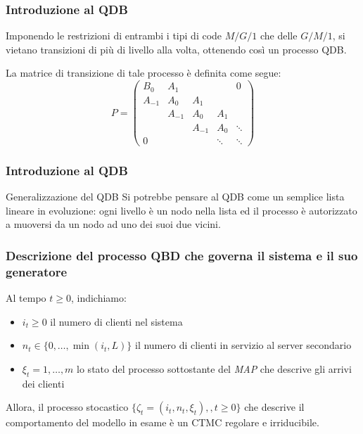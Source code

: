 \documentclass{beamer}
\begin{document}
\begin{frame}
    \frametitle{Introduzione al QDB}

    \begin{block}{}
        Imponendo le restrizioni di entrambi i tipi di code $M/G/1$ che delle $G/M/1$, si vietano transizioni di più di livello alla volta, ottenendo così un processo QDB.
    \end{block}
    La matrice di transizione di tale processo è definita come segue:
    \begin{equation*}
        P=
        \begin{pmatrix}
            B_0 & A_1 & & & 0 \\
            A_{-1} & A_0 & A_1 & & \\
            & A_{-1} & A_0 & A_1 & \\
            & & A_{-1} & A_0 & \ddots \\
            0 & & & \ddots & \ddots
        \end{pmatrix}
    \end{equation*}

\end{frame}


\begin{frame}
    \frametitle{Introduzione al QDB}
    \begin{block}{Generalizzazione del QDB}
        Si potrebbe pensare al QDB come un semplice lista lineare in evoluzione: ogni livello è un nodo nella lista ed il processo è autorizzato a muoversi da un nodo ad uno dei suoi due vicini.
    \end{block}
\end{frame}


\begin{frame}
    \frametitle{Descrizione del processo QBD che governa il sistema e il suo generatore}
    Al tempo $t\geq 0$, indichiamo:
    \begin{itemize}
        \item $i_t\geq 0$ il numero di clienti nel sistema
        \item $n_t\in\{0,\ldots,\min(i_t,L)\}$ il numero di clienti in servizio al server secondario
        \item $\xi_t=1,\ldots,m$ lo stato del processo sottostante del \emph{MAP} che descrive gli arrivi dei clienti
    \end{itemize}
    \begin{block}{}
        Allora, il processo stocastico $\{\zeta_t=(i_t,n_t,\xi_t),,t\geq 0\}$ che descrive il comportamento del modello in esame è un CTMC regolare e irriducibile.
    \end{block}
\end{frame}
\end{document}
